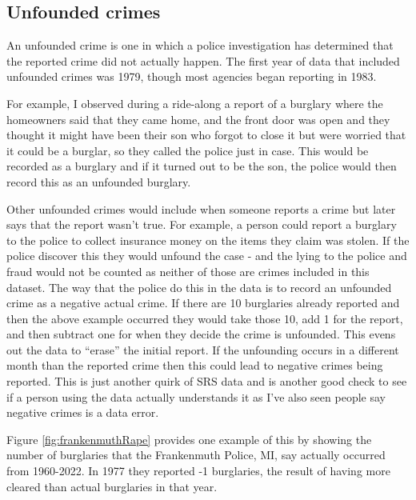 \documentclass[
]{krantz}
\begin{document}
\subsection{Unfounded crimes}\label{unfounded}

An unfounded crime is one in which a police investigation
has determined that the reported crime did not actually
happen. The first year of data that included unfounded
crimes was 1979, though most agencies began reporting in
1983.

For example, I observed during a ride-along a report of a
burglary where the homeowners said that they came home, and
the front door was open and they thought it might have been
their son who forgot to close it but were worried that it
could be a burglar, so they called the police just in case.
This would be recorded as a burglary and if it turned out to
be the son, the police would then record this as an
unfounded burglary.

Other unfounded crimes would include when someone reports a
crime but later says that the report wasn't true. For
example, a person could report a burglary to the police to
collect insurance money on the items they claim was stolen.
If the police discover this they would unfound the case -
and the lying to the police and fraud would not be counted
as neither of those are crimes included in this dataset. The
way that the police do this in the data is to record an
unfounded crime as a negative actual crime. If there are 10
burglaries already reported and then the above example
occurred they would take those 10, add 1 for the report, and
then subtract one for when they decide the crime is
unfounded. This evens out the data to ``erase'' the initial
report. If the unfounding occurs in a different month than
the reported crime then this could lead to negative crimes
being reported. This is just another quirk of SRS data and
is another good check to see if a person using the data
actually understands it as I've also seen people say
negative crimes is a data error.

Figure \ref{fig:frankenmuthRape} provides one example of
this by showing the number of burglaries that the
Frankenmuth Police, MI, say actually occurred from
1960-2022. In 1977 they reported -1 burglaries, the result
of having more cleared than actual burglaries in that year.
\end{document}
